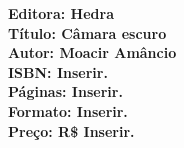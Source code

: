 \vfill

\noindent\begin{minipage}[c]{1\linewidth}
{\small\textbf{
\hspace*{-.1cm}Editora: Hedra\\
Título: Câmara escuro\\
Autor: Moacir Amâncio\\ 
ISBN: Inserir.\\
Páginas: Inserir.\\
Formato: Inserir.\\
Preço: R\$ Inserir.\\
}}
\end{minipage}

\pagebreak

\vspace*{1.5cm}


\bigskip

\hfill{}

\bigskip
\bigskip
\bigskip

